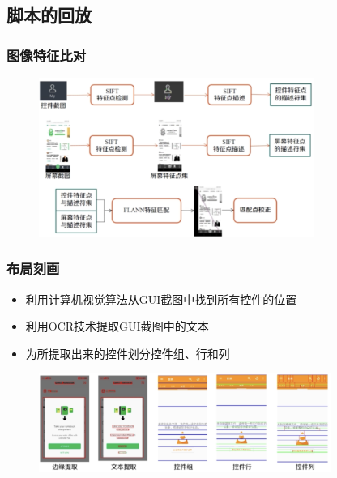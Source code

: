 \subsection{脚本的回放}

\subsubsection{图像特征比对}
\begin{figure}[H]
    \vspace{-0.5em}
	\centering
	\includegraphics[width=0.8\textwidth]{images/图像特征比对.png}
    \vspace{-1em}
\end{figure}

\subsubsection{布局刻画}
\begin{itemize}
    \item 利用计算机视觉算法从GUI截图中找到所有控件的位置
    \item 利用OCR技术提取GUI截图中的文本
    \item 为所提取出来的控件划分控件组、行和列
\end{itemize}

\begin{figure}[H]
    \vspace{-0.5em}
	\centering
	\includegraphics[width=0.85\textwidth]{images/布局刻画.png}
    \vspace{-1em}
\end{figure}

